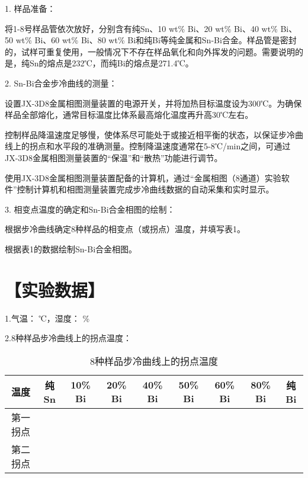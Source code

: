 \documentclass[a4paper,utf8]{article}
\begin{document}
1. 样品准备：

将1-8号样品管依次放好，分别含有纯Sn、10 wt\% Bi、20 wt\% Bi、40 wt\% Bi、50 wt\% Bi、60 wt\% Bi、80 wt\% Bi和纯Bi等纯金属和Sn-Bi合金。样品管是密封的，试样可重复使用，一般情况下不存在样品氧化和向外挥发的问题。需要说明的是，纯Sn的熔点是232℃，而纯Bi的熔点是271.4℃。

2. Sn-Bi合金步冷曲线的测量：

    设置JX-3D8金属相图测量装置的电源开关，并将加热目标温度设为300℃。为确保样品全部熔化，通常目标温度比体系最高熔化温度再升高30℃左右。
    
    控制样品降温速度足够慢，使体系尽可能处于或接近相平衡的状态，以保证步冷曲线上的拐点和水平段的准确测量。控制降温速度通常在5-8℃/min之间，可通过JX-3D8金属相图测量装置的“保温”和“散热”功能进行调节。
    
    使用JX-3D8金属相图测量装置配备的计算机，通过“金属相图（8通道）实验软件”控制计算机和相图测量装置完成步冷曲线数据的自动采集和实时显示。

3. 相变点温度的确定和Sn-Bi合金相图的绘制：
    
    根据步冷曲线确定8种样品的相变点（或拐点）温度，并填写表1。
    
    根据表1的数据绘制Sn-Bi合金相图。

\section*{【实验数据】}

1.气温：\uline{\makebox[25mm]{}} ℃，湿度：\uline{\makebox[25mm]{}} \%


2.8种样品步冷曲线上的拐点温度：

\begin{table}[ht!]
    \centering
    \caption{8种样品步冷曲线上的拐点温度}
    \begin{tabular}{|c|c|c|c|c|c|c|c|c|}
    \hline
        温度 & 纯Sn & 10\% Bi & 20\% Bi & 40\% Bi & 50\% Bi & 60\% Bi & 80\% Bi & 纯Bi \\ \hline
        第一拐点 &  &  &  &  &  &  &  &  \\ \hline
        第二拐点 &  &  &  &  &  &  &  &  \\ \hline
        \end{tabular}
    \end{table}
    
\end{document}
